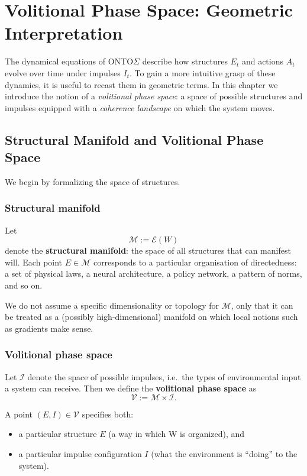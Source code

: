 \documentclass[12pt,a4paper]{report}
\newcommand{\Will}{W}
\begin{document}
\chapter{Volitional Phase Space: Geometric Interpretation}

The dynamical equations of ONTO$\Sigma$ describe how structures \(E_t\) and actions \(A_t\) evolve over time under impulses \(I_t\). To gain a more intuitive grasp of these dynamics, it is useful to recast them in geometric terms. In this chapter we introduce the notion of a \emph{volitional phase space}: a space of possible structures and impulses equipped with a \emph{coherence landscape} on which the system moves.

\section{Structural Manifold and Volitional Phase Space}

We begin by formalizing the space of structures.

\subsection*{Structural manifold}

Let
\[
    \mathcal{M} := \mathcal{E}(\Will)
\]
denote the \textbf{structural manifold}: the space of all structures that can manifest will. Each point \(E \in \mathcal{M}\) corresponds to a particular organisation of directedness: a set of physical laws, a neural architecture, a policy network, a pattern of norms, and so on.

We do not assume a specific dimensionality or topology for \(\mathcal{M}\), only that it can be treated as a (possibly high-dimensional) manifold on which local notions such as gradients make sense.

\subsection*{Volitional phase space}

Let \(\mathcal{I}\) denote the space of possible impulses, i.e.\ the types of environmental input a system can receive. Then we define the \textbf{volitional phase space} as
\[
    \mathcal{V} := \mathcal{M} \times \mathcal{I}.
\]

A point \((E, I) \in \mathcal{V}\) specifies both:

\begin{itemize}[leftmargin=2em]
    \item a particular structure \(E\) (a way in which \Will{} is organized), and
    \item a particular impulse configuration \(I\) (what the environment is ``doing'' to the system).
\end{itemize}
\end{document}
